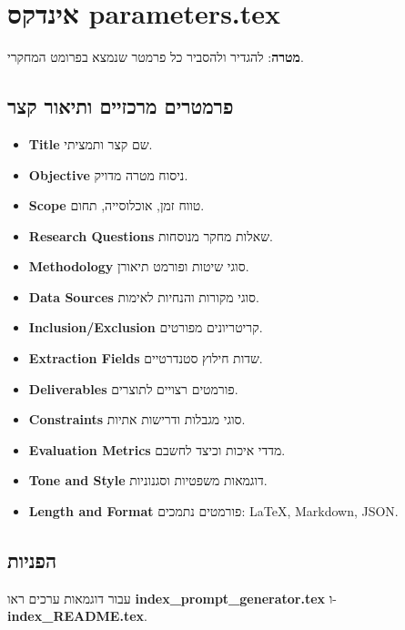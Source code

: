 \documentclass[12pt]{article}
\begin{document}
\section*{אינדקס parameters.tex}
\textbf{מטרה}:
להגדיר ולהסביר כל פרמטר שנמצא בפרומט המחקרי.

\subsection*{פרמטרים מרכזיים ותיאור קצר}
\begin{itemize}
  \item \textbf{Title} שם קצר ותמציתי.
  \item \textbf{Objective} ניסוח מטרה מדויק.
  \item \textbf{Scope} טווח זמן, אוכלוסייה, תחום.
  \item \textbf{Research Questions} שאלות מחקר מנוסחות.
  \item \textbf{Methodology} סוגי שיטות ופורמט תיאורן.
  \item \textbf{Data Sources} סוגי מקורות והנחיות לאימות.
  \item \textbf{Inclusion/Exclusion} קריטריונים מפורטים.
  \item \textbf{Extraction Fields} שדות חילוץ סטנדרטיים.
  \item \textbf{Deliverables} פורמטים רצויים לתוצרים.
  \item \textbf{Constraints} סוגי מגבלות ודרישות אתיות.
  \item \textbf{Evaluation Metrics} מדדי איכות וכיצד לחשבם.
  \item \textbf{Tone and Style} דוגמאות משפטיות וסגנוניות.
  \item \textbf{Length and Format} פורמטים נתמכים: LaTeX, Markdown, JSON.
\end{itemize}

\subsection*{הפניות}
עבור דוגמאות ערכים ראו \textbf{index\_prompt\_generator.tex} ו-\textbf{index\_README.tex}.
\end{document}
